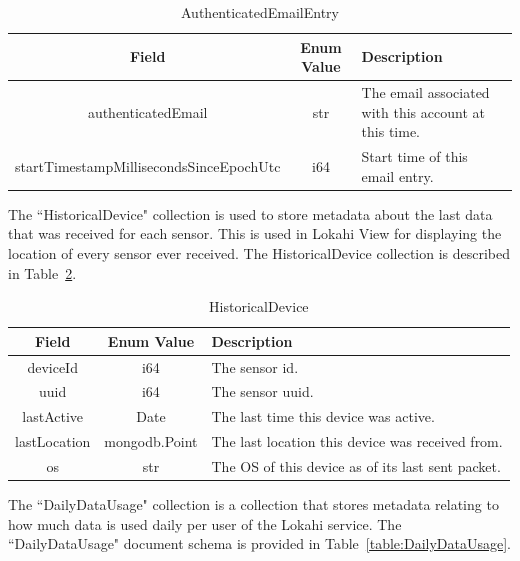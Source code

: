 \begin{table}[H]
	\centering
	\caption{AuthenticatedEmailEntry}
	\begin{tabular}{|c|c| p{8cm} |}
		\hline
		Field & Enum Value & Description  \\
		\hline
		authenticatedEmail & str & The email associated with this account at this time. \\
		\hline
		startTimestampMillisecondsSinceEpochUtc & i64 & Start time of this email entry. \\
		\hline
	\end{tabular}
	\label{table:AuthenticatedEmailEntry}
\end{table}

The ``HistoricalDevice" collection is used to store metadata about the last data that was received for each sensor. This is used in Lokahi View for displaying the location of every sensor ever received. The HistoricalDevice collection is described in Table~\ref{table:HistoricalDevice}.

\begin{table}[H]
	\centering
	\caption{HistoricalDevice}
	\begin{tabular}{|c|c| p{8cm} |}
		\hline
		Field & Enum Value & Description  \\
		\hline
		deviceId & i64 & The sensor id. \\
		\hline
		uuid & i64 & The sensor uuid. \\
		\hline
		lastActive & Date & The last time this device was active. \\
		\hline
		lastLocation & mongodb.Point & The last location this device was received from. \\
		\hline
		os & str & The OS of this device as of its last sent packet. \\
		\hline
	\end{tabular}
	\label{table:HistoricalDevice}
\end{table}

The ``DailyDataUsage" collection is a collection that stores metadata relating to how much data is used daily per user of the Lokahi service. The ``DailyDataUsage" document schema is provided in Table~\ref{table:DailyDataUsage}.

